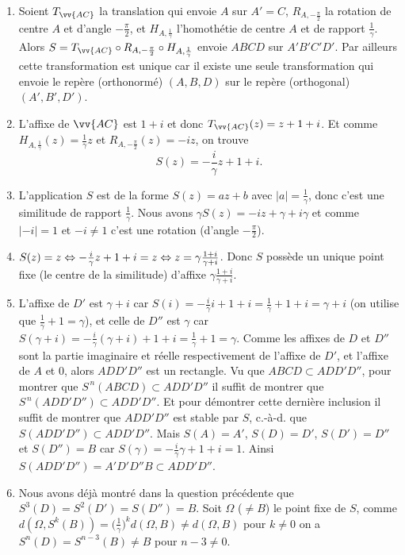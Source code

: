 \documentclass[a4paper,12pt,reqno]{amsart}
\begin{document}
\begin{solution}
  \begin{enumerate}
    \item Soient $T_{\vv{AC}}$ la translation qui envoie $A$ sur $A'=C$, $R_{A,-\frac{\pi}{2}}$ la rotation de centre $A$ et d'angle $-\frac{\pi}{2}$, et $H_{A,\frac{1}{\gamma}}$ l'homothétie de centre $A$ et de rapport $\frac{1}{\gamma}$. Alors $S=T_{\vv{AC}}\circ R_{A,-\frac{\pi}{2}}\circ H_{A,\frac{1}{\gamma}}$ envoie $ABCD$ sur $A'B'C'D'$.\newline
    Par ailleurs cette transformation est unique car il existe une seule transformation qui envoie le repère (orthonormé) $(A,B,D)$ sur le repère (orthogonal) $(A',B',D')$.
    \item L'affixe de $\vv{AC}$ est $1+i$ et donc $T_{\vv{AC}}(z)=z+1+i$. Et comme $H_{A,\frac{1}{\gamma}}(z)=\frac{1}{\gamma}z$ et $R_{A,-\frac{\pi}{2}}(z)=-iz$, on trouve\vspace{-.7\baselineskip}
    \[
      S(z)=-\frac{i}{\gamma}z+1+i.
    \]
    \item L'application $S$ est de la forme $S(z)=az+b$ avec $|a|=\frac{1}{\gamma}$, donc c'est une similitude de rapport $\frac{1}{\gamma}$. Nous avons $\gamma S(z)=-iz+\gamma+i\gamma$ et comme $|-i|=1$ et $-i \neq 1$ c'est une rotation (d'angle $-\frac{\pi}{2}$).
    \item $S(z)=z \Leftrightarrow -\frac{i}{\gamma}z+1+i=z \Leftrightarrow z=\gamma \frac{1+i}{\gamma+i}$. Donc $S$ possède un unique point fixe (le centre de la similitude) d'affixe $\gamma \frac{1+i}{\gamma+i}$.
    \item L'affixe de $D'$ est $\gamma+i$ car $S(i)=-\frac{i}{\gamma}i+1+i=\frac{1}{\gamma}+1+i=\gamma+i$ (on utilise que $\frac{1}{\gamma}+1=\gamma$), et celle de $D''$ est $\gamma$ car $S(\gamma+i)=-\frac{i}{\gamma}(\gamma+i)+1+i=\frac{1}{\gamma}+1=\gamma$.\newline
    Comme les affixes de $D$ et $D''$ sont la partie imaginaire et réelle respectivement de l'affixe de $D'$, et l'affixe de $A$ et $0$, alors $ADD'D''$ est un rectangle.\newline
    Vu que $ABCD \subset ADD'D''$, pour montrer que $S^{\, n}(ABCD) \subset ADD'D''$ il suffit de montrer que $S^{\, n}(ADD'D'') \subset ADD'D''$. Et pour démontrer cette dernière inclusion il suffit de montrer que $ADD'D''$ est stable par $S$, c.-à-d. que $S(ADD'D'') \subset ADD'D''$. Mais $S(A)=A'$, $S(D)=D'$, $S(D')=D''$ et $S(D'')=B$ car $S(\gamma)=-\frac{i}{\gamma}\gamma+1+i=1$. Ainsi $S(ADD'D'') = A'D'D''B \subset ADD'D''$.
    \item Nous avons déjà montré dans la question précédente que $S^{3}(D)=S^{2}(D')=S(D'')=B$. Soit $\Omega$ ($\neq B$) le point fixe de $S$, comme $d(\Omega,S^{k}(B))=\big(\frac{1}{\gamma}\big)^{k}d(\Omega,B) \neq d(\Omega,B)$ pour $k \neq 0$ on a $S^{n}(D)=S^{n-3}(B) \neq B$ pour $n-3 \neq 0$.
  \end{enumerate}
\end{solution}
\end{document}
